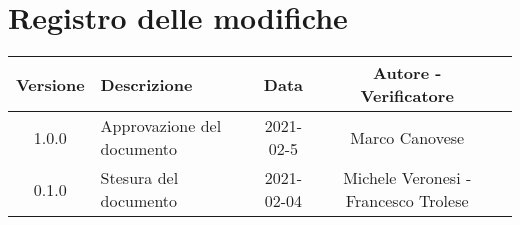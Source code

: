 \section*{Registro delle modifiche}

\begin{center}
	\begin{longtable}{|c|p{5cm}|c|c|c|}
		\hline
		\rowcolor{lighter-grayer}
		\textbf{Versione} & \textbf{Descrizione} & \textbf{Data} & \textbf{Autore - Verificatore} \\
		\hline
		\endfirsthead


		\hline
		1.0.0 & Approvazione del documento & 2021-02-5 & Marco Canovese \\
		0.1.0 & Stesura del documento & 2021-02-04 & Michele Veronesi - Francesco Trolese \\
		\hline
	\end{longtable}
\end{center}